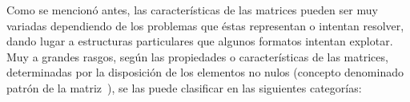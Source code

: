 Como se mencionó antes, las características de las matrices pueden ser muy variadas dependiendo de los problemas que éstas representan o intentan resolver, dando lugar a estructuras particulares que algunos formatos intentan explotar. Muy a grandes rasgos, según las propiedades o características de las matrices, determinadas por la disposición de los elementos no nulos (concepto denominado patrón de la matriz~\cite{Belgin2010}), se las puede clasificar en las siguientes categorías:



